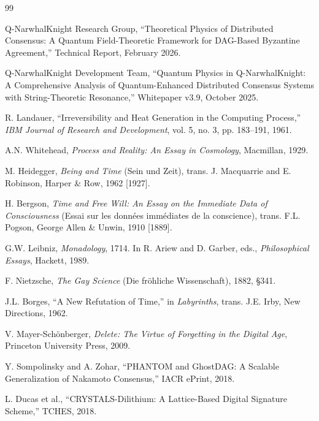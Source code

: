 \documentclass[12pt,a4paper]{article}
\theoremstyle{philosophical}
\begin{document}
\begin{thebibliography}{99}

 Q-NarwhalKnight Research Group, ``Theoretical Physics of Distributed Consensus: A Quantum Field-Theoretic Framework for DAG-Based Byzantine Agreement,'' Technical Report, February 2026.

 Q-NarwhalKnight Development Team, ``Quantum Physics in Q-NarwhalKnight: A Comprehensive Analysis of Quantum-Enhanced Distributed Consensus Systems with String-Theoretic Resonance,'' Whitepaper v3.9, October 2025.

 R. Landauer, ``Irreversibility and Heat Generation in the Computing Process,'' \textit{IBM Journal of Research and Development}, vol. 5, no. 3, pp. 183--191, 1961.

 A.N. Whitehead, \textit{Process and Reality: An Essay in Cosmology}, Macmillan, 1929.

 M. Heidegger, \textit{Being and Time} (Sein und Zeit), trans. J. Macquarrie and E. Robinson, Harper \& Row, 1962 [1927].

 H. Bergson, \textit{Time and Free Will: An Essay on the Immediate Data of Consciousness} (Essai sur les donn\'ees imm\'ediates de la conscience), trans. F.L. Pogson, George Allen \& Unwin, 1910 [1889].

 G.W. Leibniz, \textit{Monadology}, 1714. In R. Ariew and D. Garber, eds., \textit{Philosophical Essays}, Hackett, 1989.

 F. Nietzsche, \textit{The Gay Science} (Die fr\"ohliche Wissenschaft), 1882, \S341.

 J.L. Borges, ``A New Refutation of Time,'' in \textit{Labyrinths}, trans. J.E. Irby, New Directions, 1962.

 V. Mayer-Sch\"onberger, \textit{Delete: The Virtue of Forgetting in the Digital Age}, Princeton University Press, 2009.

 Y. Sompolinsky and A. Zohar, ``PHANTOM and GhostDAG: A Scalable Generalization of Nakamoto Consensus,'' IACR ePrint, 2018.

 L. Ducas et al., ``CRYSTALS-Dilithium: A Lattice-Based Digital Signature Scheme,'' TCHES, 2018.


\end{thebibliography}
\end{document}
